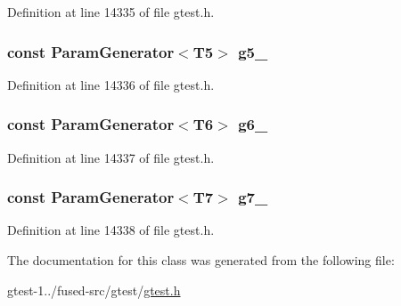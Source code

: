 \-Definition at line 14335 of file gtest.\-h.

\hypertarget{classtesting_1_1internal_1_1CartesianProductGenerator7_a938d8dc16afe9878a43d89ce3cd87ad7}{
\subsubsection[{g5\-\_\-}]{\setlength{\rightskip}{0pt plus 5cm}const {\bf \-Param\-Generator}$<$\-T5$>$ {\bf g5\-\_\-}}}\label{d1/d5a/classtesting_1_1internal_1_1CartesianProductGenerator7_a938d8dc16afe9878a43d89ce3cd87ad7}


\-Definition at line 14336 of file gtest.\-h.

\hypertarget{classtesting_1_1internal_1_1CartesianProductGenerator7_a905585e5d7722194673d92d7a29a2996}{
\subsubsection[{g6\-\_\-}]{\setlength{\rightskip}{0pt plus 5cm}const {\bf \-Param\-Generator}$<$\-T6$>$ {\bf g6\-\_\-}}}\label{d1/d5a/classtesting_1_1internal_1_1CartesianProductGenerator7_a905585e5d7722194673d92d7a29a2996}


\-Definition at line 14337 of file gtest.\-h.

\hypertarget{classtesting_1_1internal_1_1CartesianProductGenerator7_a55039ea79deff09f686dc351506af769}{
\subsubsection[{g7\-\_\-}]{\setlength{\rightskip}{0pt plus 5cm}const {\bf \-Param\-Generator}$<$\-T7$>$ {\bf g7\-\_\-}}}\label{d1/d5a/classtesting_1_1internal_1_1CartesianProductGenerator7_a55039ea79deff09f686dc351506af769}


\-Definition at line 14338 of file gtest.\-h.



\-The documentation for this class was generated from the following file\-:\begin{DoxyCompactItemize}
\item 
gtest-\/1../fused-\/src/gtest/\hyperlink{fused-src_2gtest_2gtest_8h}{gtest.\-h}\end{DoxyCompactItemize}
